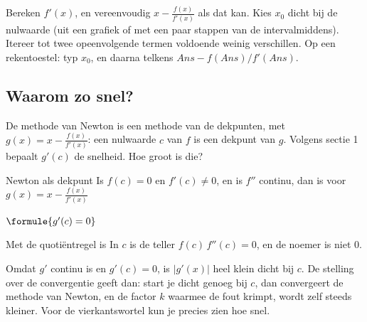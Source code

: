 \begin{werkwijze}
Bereken $f'(x)$, en vereenvoudig $x - \frac{f(x)}{f'(x)}$ als dat kan. Kies $x_0$ dicht bij de nulwaarde (uit een grafiek of met een paar stappen van de intervalmiddens). Itereer tot twee opeenvolgende termen voldoende weinig verschillen. Op een rekentoestel: typ $x_0$, en daarna telkens $\textit{Ans} - f(\textit{Ans})/f'(\textit{Ans})$.
\end{werkwijze}


\begin{oefeningen}
\end{oefeningen}

\subsection{Waarom zo snel?}

De methode van Newton is een methode van de dekpunten, met $g(x) = x - \frac{f(x)}{f'(x)}$: een nulwaarde $c$ van $f$ is een dekpunt van $g$. Volgens sectie 1 bepaalt $g'(c)$ de snelheid. Hoe groot is die?

\begin{theorie}
\begin{stelling}{Newton als dekpunt}
Is $f(c) = 0$ en $f'(c) \neq 0$, en is $f''$ continu, dan is voor $g(x) = x - \frac{f(x)}{f'(x)}$

\vspace{1mm}
\qquad $\formule{g'(c) = 0}$
\end{stelling}

\begin{bewijs}
Met de quotiëntregel is
In $c$ is de teller $f(c)\,f''(c) = 0$, en de noemer is niet 0.
\end{bewijs}
\end{theorie}

Omdat $g'$ continu is en $g'(c) = 0$, is $|g'(x)|$ heel klein dicht bij $c$. De stelling over de convergentie geeft dan: start je dicht genoeg bij $c$, dan convergeert de methode van Newton, en de factor $k$ waarmee de fout krimpt, wordt zelf steeds kleiner. Voor de vierkantswortel kun je precies zien hoe snel.


